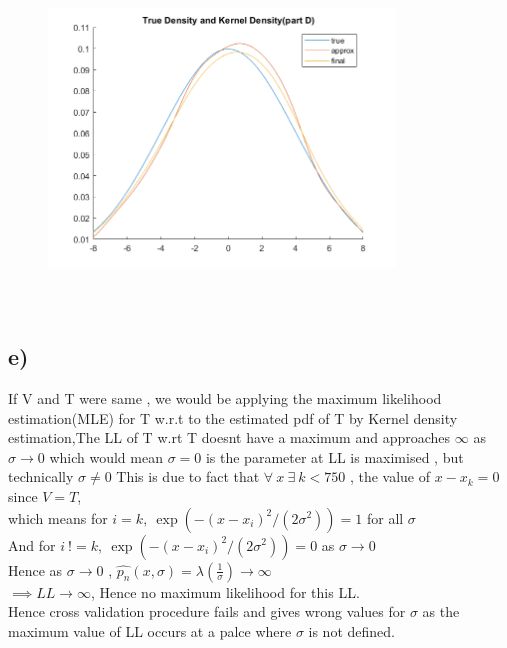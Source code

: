 \documentclass{article}
\begin{document}
\begin{figure}[H]
\begin{floatrow}
    {\includegraphics[width =9.2cm, height=9cm]{final.png}}
    \end{floatrow}
    \end{figure}
\subsection*{e)}
If V and T were same , we would be applying the maximum likelihood estimation(MLE) for T w.r.t to the estimated pdf of T by Kernel density estimation,The LL of T w.rt T doesnt have a maximum and approaches $\infty$ as $\sigma \to 0$ which would mean $\sigma = 0$ is the parameter at LL is maximised , but technically $\sigma \neq 0$\newpage
This is due to fact that $\forall \ x\  \exists \ k < 750$ , the value of $x-x_k=0$ since $V=T$,\\ which means for $i=k, \ \exp{(-(x - x_i)^2/(2 \sigma^2))}= 1$ for all $\sigma$ \\And for $i\ !=k, \ \exp{(-(x - x_i)^2/(2 \sigma^2))} = 0 $ as $\sigma \to 0$\\
Hence as $\sigma \to 0$ , $\hat{p_n}(x,\sigma) = \lambda(\frac{1}{\sigma}) \to \infty$\\
$\implies LL\to \infty$, Hence no maximum likelihood for this LL.\\
Hence cross validation procedure fails and gives wrong values for $\sigma$ as the maximum value of LL occurs at a palce where $\sigma$ is not defined.\\
\end{document}
